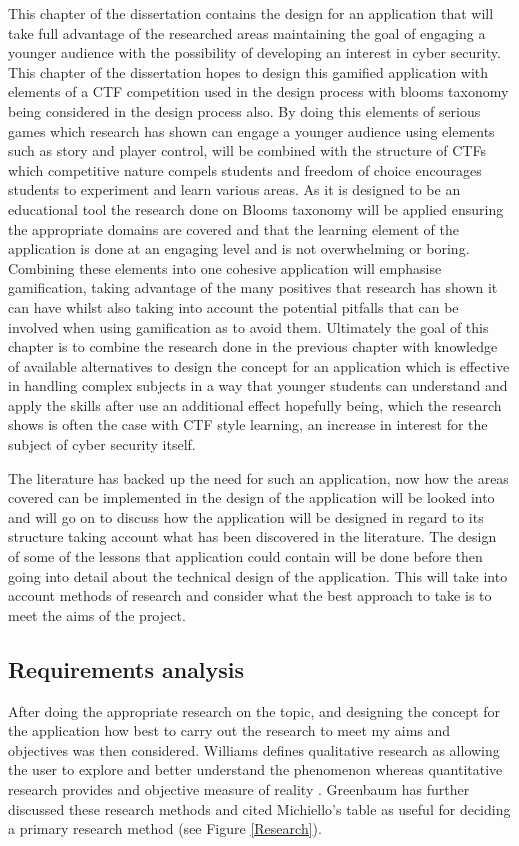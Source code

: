 \documentclass[12pt,a4paper]{article}
\begin{document}
This chapter of the dissertation contains the design for an application that will take full advantage of the researched areas maintaining the goal of engaging a younger audience with the possibility of developing an interest in cyber security. This chapter of the dissertation hopes to design this gamified application with elements of a CTF competition used in the design process with blooms taxonomy being considered in the design process also. By doing this elements of serious games which research has shown can engage a younger audience using elements such as story and player control, will be combined with the structure of CTFs which competitive nature compels students and freedom of choice encourages students to experiment and learn various areas. As it is designed to be an educational tool the research done on Blooms taxonomy will be applied ensuring the appropriate domains are covered and that the learning element of the application is done at an engaging level and is not overwhelming or boring. Combining these elements into one cohesive application will emphasise gamification, taking advantage of the many positives that research has shown it can have whilst also taking into account the potential pitfalls that can be involved when using gamification as to avoid them. Ultimately the goal of this chapter is to combine the research done in the previous chapter with knowledge of available alternatives to design the concept for an application which is effective in handling complex subjects in a way that younger students can understand and apply the skills after use an additional effect hopefully being, which the research shows is often the case with CTF style learning, an increase in interest for the subject of cyber security itself. 

The literature has backed up the need for such an application, now how the areas covered can be implemented in the design of the application will be looked into and will go on to discuss how the application will be designed in regard to its structure taking account what has been discovered in the literature. The design of some of the lessons that application could contain will be done before then going into detail about the technical design of the application. This will take into account methods of research and consider what the best approach to take is to meet the aims of the project. 

\subsection{Requirements analysis} 
After doing the appropriate research on the topic, and designing the concept for the application how best to carry out the research to meet my aims and objectives was then considered. Williams defines qualitative research as allowing the user to explore and better understand the phenomenon whereas quantitative research provides and objective measure of reality \cite{williams2007research}. Greenbaum has further discussed these research methods \cite{greenbaum1999moderating} and cited Michiello's table as useful for deciding a primary research method (see Figure \ref{Research}). 
\end{document}
